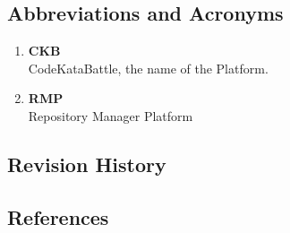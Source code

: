 \subsection{Abbreviations and Acronyms}
\begin{enumerate}[label=$\bullet$]
    \item \textbf{CKB}\\CodeKataBattle, the name of the Platform.
    \item \textbf{RMP}\\Repository Manager Platform
\end{enumerate}

\subsection{Revision History}

\subsection{References}

